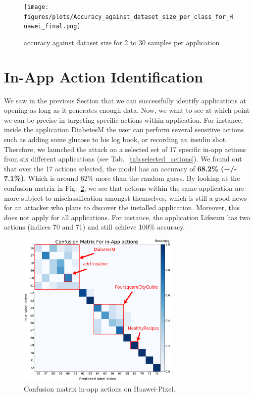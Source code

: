 \begin{figure}[ht]
 \centering
 \texttt{[image: figures/plots/Accuracy\_against\_dataset\_size\_per\_class\_for\_Huawei\_final.png]}
 \caption{accuracy against dataset size for 2 to 30 samples per application}
 \label{fig:plot_accuray_dataset_size}
\end{figure}






\section{In-App Action Identification}
\label{sec:in-App}
We saw in the previous Section that we can successfully identify applications at opening as long as it generates enough data. Now, we want to see at which point we can be precise in targeting specific actions within application. For instance, inside the application DiabetesM the user can perform several sensitive actions such as adding some glucose to his log book, or recording an insulin shot. Therefore, we launched the attack on a selected set of 17 specific in-app actions from six different applications (see  Tab.~\ref{tab:selected_actions}). We found out that over the 17 actions selected, the model has an accuracy of \textbf{68.2\% (+/- 7.1\%)}. Which is around 62\% more than the random guess. By looking at the confusion matrix in Fig.~\ref{fig:in-app huawei}, we see that actions within the same application are more subject to misclassification amongst themselves, which is still a good news for an attacker who plans to discover the installed application. Moreover, this does not apply for all applications. For instance, the application Lifesum has two actions (indices 70 and 71) and still achieve 100\% accuracy.


\begin{figure}[H]
 \centering
 \includegraphics[width=0.7\textwidth]{figures/cm/all_inApp_action_annoted.png}
 \caption{Confusion matrix in-app actions on Huawei-Pixel.}
 \label{fig:in-app huawei}
\end{figure}


